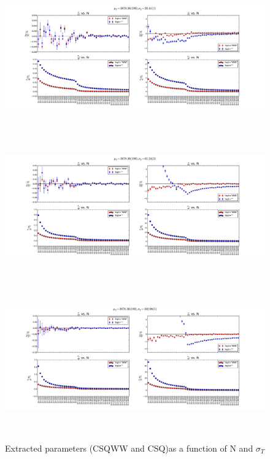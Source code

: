\documentclass[12pt]{article}
\begin{document}
\clearpage

\begin{figure}[ht]
	\includegraphics[height=2.5in,width=5.5in]{fit-comp_MU-190_SG-1_fit-opt-WW_binw-025.pdf}
	\includegraphics[height=2.5in,width=5.5in]{fit-comp_MU-190_SG-3_fit-opt-WW_binw-025.pdf}
	\includegraphics[height=2.5in,width=5.5in]{fit-comp_MU-190_SG-5_fit-opt-WW_binw-025.pdf}
	\caption{Extracted parameters (CSQWW and CSQ)as a function of N and $\sigma_{T}$}
	\label{fig3}
\end{figure}

\clearpage
\end{document}
